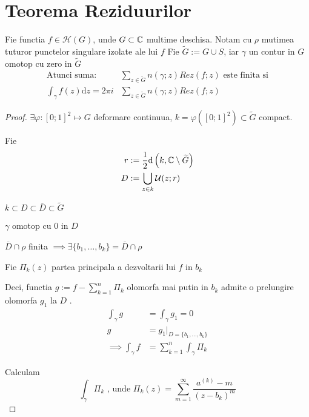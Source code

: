 \section{Teorema Reziduurilor}

\begin{theorem}
    Fie functia $f\in \mathcal{H}(G)$, unde $G \subset \mathbb{C}$ multime deschisa.
		Notam cu $\rho$  mutimea tuturor punctelor singulare izolate ale lui $f$
    Fie $\widetilde{G}:=G \cup S $, iar $\gamma$ un contur in $G$ omotop cu zero in $\widetilde{G}$
    \begin{align*}
			\text{Atunci suma: } &\sum_{z \in \widetilde{G}} {n(\gamma;z) Rez(f;z)} \text{ este finita si}  \\
			\int_{\gamma} f(z) \mathrm{d}z = 2\pi i &\sum_{z \in \widetilde{G}} n(\gamma;z) Rez(f;z)
    \end{align*}
    \begin{proof}
        $\exists \varphi:[0;1]^2 \mapsto G$ deformare continuua,
        $k = \varphi ([0;1]^2) \subset \widetilde{G}$ compact.

				Fie
        \begin{align*}
            r &:= \frac{1}{2} \mathrm{d} \left(k, \mathbb{C} \setminus \widetilde{G}\right)
            \\
            D &:= \bigcup_{z\in k} \mathcal{U}(z;r)
        \end{align*}

        $k \subset D \subset \overline{D} \subset \widetilde{G}$

        $\gamma$ omotop cu $0$ in $D$

        $\overline{D} \cap \rho$ finita
				$\implies \exists \{b_1, \dotsc, b_k \} = \overline{D} \cap \rho$

        Fie $\Pi_{k}(z)$ partea principala a dezvoltarii lui $f$ in $b_k$

			  Deci, functia $\displaystyle g := f - \sum_{k=1}^{n} \Pi_k$
				olomorfa mai putin in $b_k$ admite o prelungire olomorfa $g_1$ la $D$ .
        \begin{align*}
            \int_{\gamma}  g &= \int_{\gamma} g_1 = 0 \\
                           g &= g_1 |_{D=\{b_1, \dotsc, b_k\}}\\
            \implies \int_{\gamma} f &= \sum_{k=1}^{n} \int_{\gamma} \Pi_k
        \end{align*}

        Calculam
				\[
					\int_{\gamma} \Pi_k \text{ , unde }
					\Pi_k(z) = \sum_{m=1}^{\infty} \frac{a^{(k)} - m }{(z - b_k)^m}
				\]


\end{proof}
\end{theorem}
